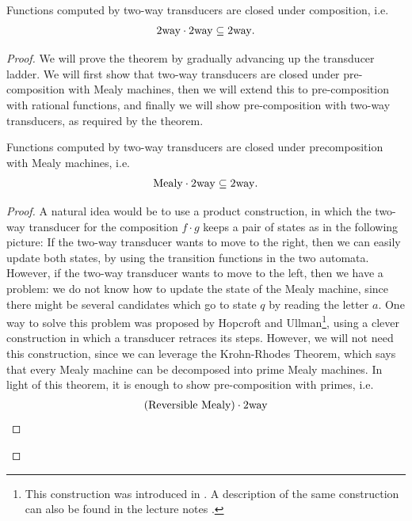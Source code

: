 \begin{theorem}\label{thm:composition-of-two-way-transducers}
    Functions computed by two-way transducers are closed under composition, i.e.~
\begin{align*}\mathrm{2way} \cdot \mathrm{2way} \subseteq \mathrm{2way}.    
\end{align*}
\end{theorem}
\begin{proof}
    We will prove the theorem by gradually advancing up the transducer ladder. We will first show that two-way transducers are closed under pre-composition with Mealy machines, then we will extend this to pre-composition with rational functions, and finally we will show pre-composition with two-way transducers, as required by the theorem.

    \begin{lemma}\label{lem:2dfa-precomposition-with-mealy}
        Functions computed by two-way transducers are closed under precomposition with Mealy machines, i.e.
        \begin{align*}
        \mathrm{Mealy} \cdot \mathrm{2way} 
        \subseteq \mathrm{2way}.   
        \end{align*}
    \end{lemma}
    \begin{proof} 
        A natural idea would be to use a product construction, in which the two-way transducer for the composition $f \cdot g$ keeps a pair of states as in the following picture:
        If the two-way transducer wants to move to the right, then we can easily update both states, by using the transition functions in the two automata. However, if the two-way transducer wants to move to the left, then we have a problem: we do not know how to update the state of the Mealy machine, since there might be several candidates which go to state $q$ by reading the letter $a$.  One way to solve this problem was proposed by  Hopcroft and Ullman\footnote{This construction was introduced in  
        \cite[Lemma 3]{hopcroftUllman1967}.
        A description of the same construction can also be found in the lecture notes
        \cite[Lemma 17.4]{bojanczyk_automata_2025}.
        }, using a clever construction in which a transducer retraces its steps.  However, we will not need this construction, since we can leverage the Krohn-Rhodes Theorem, which says that every Mealy machine can be decomposed into prime Mealy machines. In light of this theorem, it is enough to show pre-composition with primes, i.e.~
\begin{align*}\text{(Reversible Mealy)} \cdot \twodftmath 

\end{align*}
\end{proof}
\end{proof}
